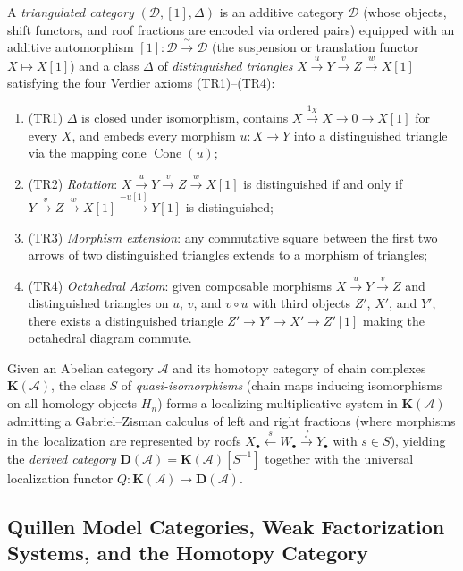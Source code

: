 A \emph{triangulated category} $(\mathcal{D}, [1], \Delta)$ is an additive category $\mathcal{D}$ (whose objects, shift functors, and roof fractions are encoded via ordered pairs) equipped with an additive automorphism $[1]\colon \mathcal{D} \xrightarrow{\;\sim\;} \mathcal{D}$ (the suspension or translation functor $X \mapsto X[1]$) and a class $\Delta$ of \emph{distinguished triangles} $X \xrightarrow{u} Y \xrightarrow{v} Z \xrightarrow{w} X[1]$ satisfying the four Verdier axioms \textup{(TR1)}--\textup{(TR4)}:
\begin{enumerate}
\item \textup{(TR1)} $\Delta$ is closed under isomorphism, contains $X \xrightarrow{1_X} X \to 0 \to X[1]$ for every $X$, and embeds every morphism $u\colon X \to Y$ into a distinguished triangle via the mapping cone $\operatorname{Cone}(u)$;
\item \textup{(TR2)} \emph{Rotation}: $X \xrightarrow{u} Y \xrightarrow{v} Z \xrightarrow{w} X[1]$ is distinguished if and only if $Y \xrightarrow{v} Z \xrightarrow{w} X[1] \xrightarrow{-u[1]} Y[1]$ is distinguished;
\item \textup{(TR3)} \emph{Morphism extension}: any commutative square between the first two arrows of two distinguished triangles extends to a morphism of triangles;
\item \textup{(TR4)} \emph{Octahedral Axiom}: given composable morphisms $X \xrightarrow{u} Y \xrightarrow{v} Z$ and distinguished triangles on $u$, $v$, and $v \circ u$ with third objects $Z'$, $X'$, and $Y'$, there exists a distinguished triangle $Z' \to Y' \to X' \to Z'[1]$ making the octahedral diagram commute.
\end{enumerate}
Given an Abelian category $\mathcal{A}$ and its homotopy category of chain complexes $\mathbf{K}(\mathcal{A})$, the class $S$ of \emph{quasi-isomorphisms} (chain maps inducing isomorphisms on all homology objects $H_n$) forms a localizing multiplicative system in $\mathbf{K}(\mathcal{A})$ admitting a Gabriel--Zisman calculus of left and right fractions (where morphisms in the localization are represented by roofs $X_\bullet \xleftarrow{s} W_\bullet \xrightarrow{f} Y_\bullet$ with $s \in S$), yielding the \emph{derived category} $\mathbf{D}(\mathcal{A}) = \mathbf{K}(\mathcal{A})[S^{-1}]$ together with the universal localization functor $Q\colon \mathbf{K}(\mathcal{A}) \to \mathbf{D}(\mathcal{A})$.

\subsection{Quillen Model Categories, Weak Factorization Systems, and the Homotopy Category}
\label{subsec:quillen_model_categories_lifting_homotopy_category}

